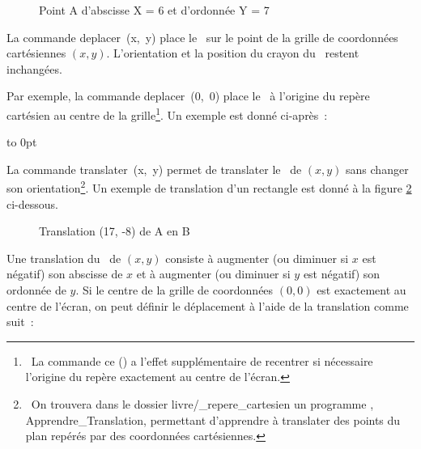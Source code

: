 \begin{figure}[htbp]
 \caption{Point A d'abscisse X = 6 et d'ordonnée Y = 7}
 \label{fig:coorA}
\end{figure}

La commande {\idt deplacer\ (x,\ y)} place le \robot\ sur le point de la grille de coordonnées cartésiennes $(x, y)$. 
L'orientation et la position du crayon du \robot\ restent inchangées. 

Par exemple, la commande {\idt deplacer\ (0,\ 0)} place le \robot\ à l'origine du repère
cartésien au centre de la grille\footnote{\ La commande {\idt ce ()} a l'effet supplémentaire
de recentrer si nécessaire l'origine du repère exactement au centre de l'écran.}. 
Un exemple est donné ci-après~:

\clearpage
\vspace*{-1cm}
 {\raggedright 
 \vbox to 0pt{\vspace*{\baselineskip}\vspace*{6cm}%
 }%
 \label{prog:LigneDeCarres1}
 
 }

La commande {\idt translater\ (x,\ y)} permet de translater le \robot\ de $(x, y)$
sans changer son orientation\footnote{\ On trouvera dans le dossier {\idt livre/\_repere\_cartesien}
un programme \ocaml, {\idt Apprendre\_Translation}, permettant d'apprendre à translater des points du plan 
repérés par des coordonnées cartésiennes.}. Un exemple de translation d'un rectangle est donné à la figure 
\ref{fig:extrans} ci-dessous.
\begin{figure}[h]
%
 \caption{Translation (17, -8) de A en B}\label{fig:extrans}
\end{figure}
\newpage
Une translation du \robot\ de $(x, y)$ consiste à augmenter (ou diminuer si $x$ est négatif)
son abscisse de $x$ et à augmenter (ou diminuer si $y$ est négatif)
son ordonnée de $y$. Si le centre de la grille de coordonnées $(0, 0)$ est exactement au centre
de l'écran, on peut définir le déplacement à l'aide de la translation comme suit~:

{
\parindent {}
\medskip

\vspace{\neglskip}\mbox{}\par
\vspace{\neglskip}\mbox{\blc {}}\par

\medskip }

